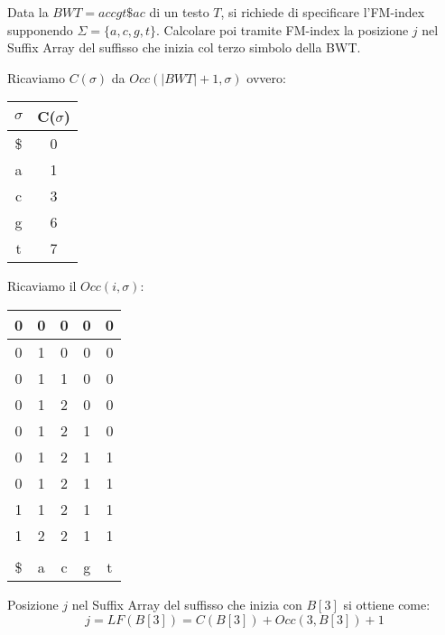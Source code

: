 \begin{esempio}
    Data la $BWT=accgt\$ac$ di un testo $T$, si richiede di specificare l'FM-index
        supponendo $\Sigma = \{a, c, g, t\}$. Calcolare poi tramite FM-index la
        posizione $j$ nel Suffix Array del suffisso che inizia col terzo simbolo
        della BWT.

        Ricaviamo $C(\sigma)$ da $Occ(|BWT| + 1, \sigma)$ ovvero:
        \begin{table}[!ht]
            \centering
            \begin{tabular}{|c|c|}
                \hline
                $\sigma$ & C($\sigma$) \\ \hline
                \$       & 0           \\ \hline
                a        & 1           \\ \hline
                c        & 3           \\ \hline
                g        & 6           \\ \hline
                t        & 7           \\ \hline
            \end{tabular}
        \end{table}
        Ricaviamo il $Occ(i, \sigma)$:
        \begin{table}[!ht]
            \centering
            \begin{tabular}{|c|c|c|c|c|}
                \hline
                0  & 0 & 0 & 0 & 0 \\ \hline
                0  & 1 & 0 & 0 & 0 \\ \hline
                0  & 1 & 1 & 0 & 0 \\ \hline
                0  & 1 & 2 & 0 & 0 \\ \hline
                0  & 1 & 2 & 1 & 0 \\ \hline
                0  & 1 & 2 & 1 & 1 \\ \hline
                0  & 1 & 2 & 1 & 1 \\ \hline
                1  & 1 & 2 & 1 & 1 \\ \hline
                1  & 2 & 2 & 1 & 1 \\ \hline  \\ \hline
                \$ & a & c & g & t \\ \hline
            \end{tabular}
        \end{table}
        Posizione $j$ nel Suffix Array del suffisso che inizia con $B[3]$ si ottiene come:
    \begin{equation}
        j = LF(B[3]) = C(B[3]) + Occ(3, B[3]) + 1
    \end{equation}
\end{esempio}
